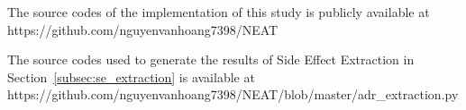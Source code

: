 \documentclass{bmcart}
\begin{document}
\begin{backmatter}
The source codes of the implementation of this study is publicly available at https://github.com/nguyenvanhoang7398/NEAT

The source codes used to generate the results of Side Effect Extraction in Section~\ref{subsec:se_extraction} is available at https://github.com/nguyenvanhoang7398/NEAT/blob/master/adr\_extraction.py







\end{backmatter}
\end{document}
